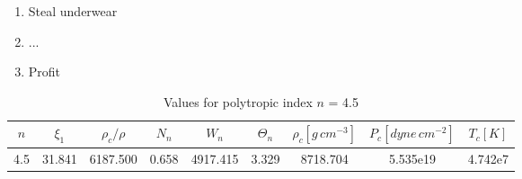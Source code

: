 \documentclass{article}
\begin{document}
\begin{enumerate}
  \item{Steal underwear}
  \item{...}
  \item{Profit}
\end{enumerate}


\begin{table}[h]
\caption{Values for polytropic index $n$ = 4.5}
\centering
\begin{tabular}{ c c c c c c c c c  }
 \hline\hline
$n$ & $\xi_1$ & $\rho_c/\rho$ & $N_{n}$ & $W_n$ & $\Theta_n$ 
& $\rho_c[g\,cm^{-3}]$ & $P_c[dyne\,cm^{-2}]$ & $T_c[K]$ \\
\hline
4.5 & 31.841 & 6187.500 & 0.658 & 4917.415 & 3.329 & 8718.704 &
5.535e19 & 4.742e7 \\
\hline
\end{tabular}\\
\label{table:nonlin}
\end{table}


\end{document}
